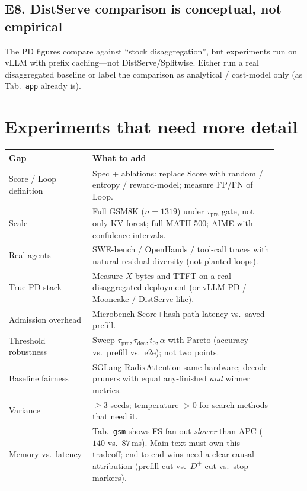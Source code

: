 \documentclass[11pt]{article}
\newcommand{\Xfer}{X}
\begin{document}
\subsection{E8. DistServe comparison is conceptual, not empirical}
The PD figures compare against ``stock disaggregation'', but experiments run
on vLLM with prefix caching---not DistServe/Splitwise. Either run a real
disaggregated baseline or label the comparison as analytical / cost-model
only (as Tab.~\texttt{app} already is).

\section{Experiments that need more detail}
\begin{center}
\small
\begin{tabular}{@{}p{0.28\linewidth}p{0.62\linewidth}@{}}
\toprule
Gap & What to add \\
\midrule
Score / Loop definition
& Spec + ablations: replace Score with random / entropy / reward-model;
  measure FP/FN of Loop. \\
\midrule
Scale
& Full GSM8K ($n{=}1319$) under $\tau_{\mathrm{pre}}$ gate, not only KV forest;
  full MATH-500; AIME with confidence intervals. \\
\midrule
Real agents
& SWE-bench / OpenHands / tool-call traces with natural residual diversity
  (not planted loops). \\
\midrule
True PD stack
& Measure $\Xfer$ bytes and TTFT on a real disaggregated deployment
  (or vLLM PD / Mooncake / DistServe-like). \\
\midrule
Admission overhead
& Microbench Score+hash path latency vs.\ saved prefill. \\
\midrule
Threshold robustness
& Sweep $\tau_{\mathrm{pre}},\tau_{\mathrm{dec}},t_0,\alpha$ with Pareto
  (accuracy vs.\ prefill vs.\ e2e); not two points. \\
\midrule
Baseline fairness
& SGLang RadixAttention same hardware; decode pruners with equal
  any-finished \emph{and} winner metrics. \\
\midrule
Variance
& $\ge 3$ seeds; temperature $>0$ for search methods that need it. \\
\midrule
Memory vs.\ latency
& Tab.~\texttt{gsm} shows FS fan-out \emph{slower} than APC ($140$ vs.\ $87$\,ms).
  Main text must own this tradeoff; end-to-end wins need a clear causal
  attribution (prefill cut vs.\ $D^{+}$ cut vs.\ stop markers). \\
\bottomrule
\end{tabular}
\end{center}
\end{document}

